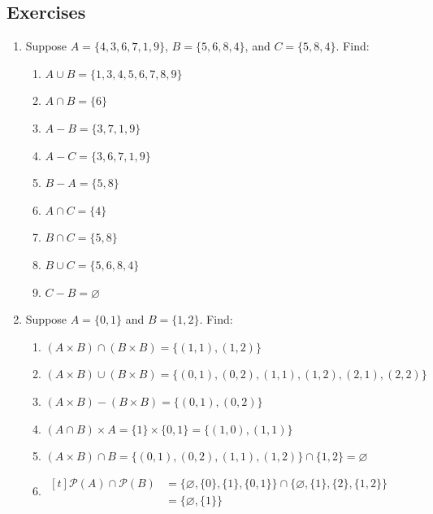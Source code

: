 \documentclass[10pt]{article}
\theoremstyle{definition}
\begin{document}
    \subsection*{Exercises}
    \begin{enumerate}
        \item Suppose $A = \{4,3,6,7,1,9\}$, $B = \{5,6,8,4\}$, and $C = \{5,8,4\}$. Find:
            \begin{enumerate}[label=(\alph*)]
                \item $A \cup B = \{1,3,4,5,6,7,8,9\}$
                \item $A \cap B = \{6\}$
                \item $A - B = \{3,7,1,9\}$
                \item $A - C = \{3,6,7,1,9\}$
                \item $B - A = \{5,8\}$
                \item $A \cap C = \{4\}$
                \item $B \cap C = \{5,8\}$
                \item $B \cup C = \{5,6,8,4\}$
                \item $C - B = \varnothing$
            \end{enumerate}
        \item Suppose $A = \{0,1\}$ and $B = \{1,2\}$. Find:
            \begin{enumerate}[label=(\alph*)]
                \item $(A \times B) \cap (B \times B) = \{(1,1),(1,2)\}$
                \item $(A \times B) \cup (B \times B) = \{(0,1),(0,2),(1,1),(1,2),(2,1),(2,2)\}$
                \item $(A \times B) - (B \times B) = \{(0,1),(0,2)\}$
                \item $(A \cap B) \times A = \{1\} \times \{0,1\} = \{(1,0),(1,1)\}$
                \item $(A \times B) \cap B = \{(0,1),(0,2),(1,1),(1,2)\} \cap \{1,2\} = \varnothing$
                \item $
                    \begin{aligned}[t]
                        \mathscr{P}(A) \cap \mathscr{P}(B) &= \{\varnothing,\{0\},\{1\},\{0,1\}\} \cap \{\varnothing,\{1\},\{2\},\{1,2\}\} \\
                        &= \{\varnothing,\{1\}\}
                    \end{aligned}
                    $

\end{enumerate}
\end{enumerate}
\end{document}

